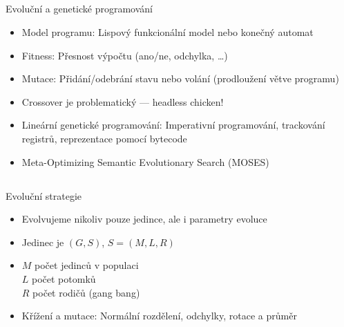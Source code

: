 \documentclass{beamer}
\begin{document}
\subsection{}
\begin{frame}{Evoluční a genetické programování}
\begin{itemize}
\item Model programu: Lispový funkcionální model nebo konečný automat
\item Fitness: Přesnost výpočtu (ano/ne, odchylka, \dots)
\item Mutace: Přidání/odebrání stavu nebo volání (prodloužení větve programu)
\item Crossover je problematický --- headless chicken!
\item Lineární genetické programování: Imperativní programování, trackování registrů, reprezentace pomocí bytecode
\item Meta-Optimizing Semantic Evolutionary Search (MOSES)
\end{itemize}
\end{frame}

\subsection{}
\begin{frame}{Evoluční strategie}
\begin{itemize}
\item Evolvujeme nikoliv pouze jedince, ale i parametry evoluce
\item Jedinec je $(G,S)$, $S=(M,L,R)$
\item $M$ počet jedinců v populaci \\ $L$ počet potomků \\ $R$ počet rodičů (gang bang)
\item Křížení a mutace: Normální rozdělení, odchylky, rotace a průměr
\end{itemize}
\end{frame}
\end{document}
